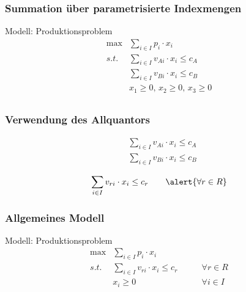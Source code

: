 \begin{frame}
 \frametitle{Summation über parametrisierte Indexmengen}
 \begin{block}{Modell: Produktionsproblem}
 \Large
 \begin{equation*}
  \begin{array}{ll}
  \max & \displaystyle\sum_{i\in I} p_i\cdot x_i\\
  s.t. & \displaystyle\sum_{i\in I} v_{Ai}\cdot x_i \leq c_A\\
	& \displaystyle\sum_{i\in I} v_{Bi}\cdot x_i \leq c_B\\
	& x_1\geq0,\,x_2\geq0,\,x_3\geq0\\
  \end{array}
 \end{equation*}
 \end{block}
\end{frame}

\begin{frame}
 \frametitle{Verwendung des Allquantors}
 \Large
 \begin{align*}
  & \sum_{i\in I} v_{Ai}\cdot x_i \leq c_A\\
  & \sum_{i\in I} v_{Bi}\cdot x_i \leq c_B
 \end{align*}
 \begin{center}\normalsize
 \end{center}
 \begin{equation*}
  \sum_{i\in I} v_{ri}\cdot x_i \leq c_r\qquad\alert{\forall r\in R}
 \end{equation*}
\end{frame}

\begin{frame}
 \frametitle{Allgemeines Modell}
 \begin{block}{Modell: Produktionsproblem}
 \begin{equation*}
  \begin{array}{lll}
  \max & \displaystyle\sum_{i\in I} p_i\cdot x_i\\
  s.t. & \displaystyle\sum_{i\in I} v_{ri}\cdot x_i \leq c_r&\qquad\forall r\in R \\
	& x_i\geq0 &\qquad\forall i\in I\\
  \end{array}
 \end{equation*}
 \end{block}
\end{frame}

